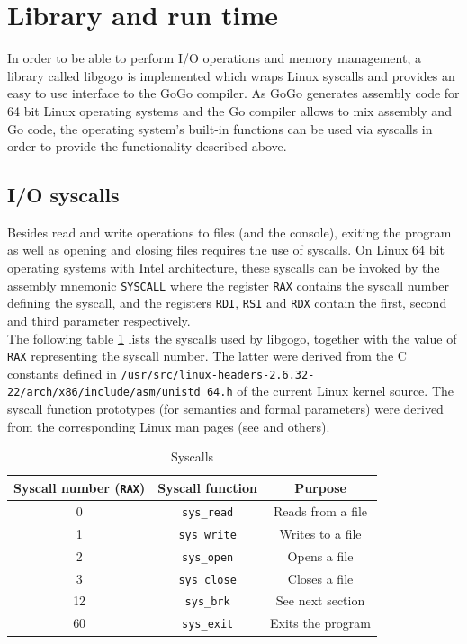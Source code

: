 \documentclass[a4paper]{scrartcl}
\let\chapter\section
\let\section\subsection
\let\subsection\subsubsection
\let\subsubsection\paragraph
\let\paragraph\subparagraph
\let\subparagraph\undefined
\begin{document}
  \chapter{Library and run time}
    In order to be able to perform I/O operations and memory management, a library called libgogo is implemented which wraps Linux syscalls and provides an easy to use interface to the GoGo compiler. As GoGo generates assembly code for 64 bit Linux operating systems and the Go compiler allows to mix assembly and Go code, the operating system's built-in functions can be used via syscalls in order to provide the functionality described above.

    \section{I/O syscalls}
      Besides read and write operations to files (and the console), exiting the program as well as opening and closing files requires the use of syscalls. On Linux 64 bit operating systems with Intel architecture, these syscalls can be invoked by the assembly mnemonic \texttt{SYSCALL} where the register \texttt{RAX} contains the syscall number defining the syscall, and the registers \texttt{RDI}, \texttt{RSI} and \texttt{RDX} contain the first, second and third parameter respectively\cite{var08}.\\
      The following table \ref{tbl:syscalls} lists the syscalls used by libgogo, together with the value of \texttt{RAX} representing the syscall number. The latter were derived from the C constants defined in \texttt{/usr/src/linux-headers-2.6.32-22/arch/x86/include/asm/unistd\_64.h} of the current Linux kernel source\cite{var10}. The syscall function prototypes (for semantics and formal parameters) were derived from the corresponding Linux man pages (see \cite{var97} and others).

      \begin{table}[htb]
      \centering
      \begin{tabular}{ccc}
        \toprule
        \textbf{Syscall number (\texttt{RAX})} & \textbf{Syscall function} & \textbf{Purpose}\\
        \midrule
        0 & \texttt{sys\_read} & Reads from a file\\
        1 & \texttt{sys\_write} & Writes to a file\\
        2 & \texttt{sys\_open} & Opens a file\\
        3 & \texttt{sys\_close} & Closes a file\\
        12 & \texttt{sys\_brk} & See next section\\
        60 & \texttt{sys\_exit} & Exits the program\\
        \bottomrule
      \end{tabular}
      \caption{Syscalls}
      \label{tbl:syscalls}
      \end{table}
\end{document}

